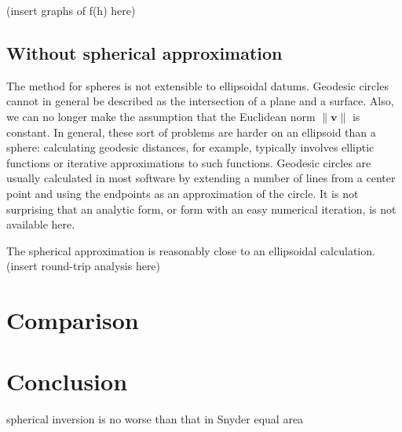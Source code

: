 \documentclass{amsart}[12pt]
\begin{document}
 (insert graphs of f(h) here)

\subsection{Without spherical approximation}
The method for spheres is not extensible to ellipsoidal datums. Geodesic
circles cannot in general be described as the intersection of a plane and a
surface. Also, we can no longer make the assumption that the Euclidean norm
$\|\mathbf v\|$ is constant. In general, these sort of problems are harder
on an ellipsoid than a sphere: calculating geodesic distances, for example,
typically involves elliptic functions or iterative approximations to such
functions. Geodesic circles are usually calculated in most software by
extending a number of lines from a center point and using the endpoints as an
approximation of the circle. It is not surprising that an analytic form, or
form with an easy numerical iteration, is not available here.

The spherical approximation is reasonably close to an ellipsoidal
calculation. (insert round-trip analysis here)

\section{Comparison}

\section{Conclusion}

spherical inversion is no worse than that in Snyder equal area \cite{snyder92}



\end{document}
